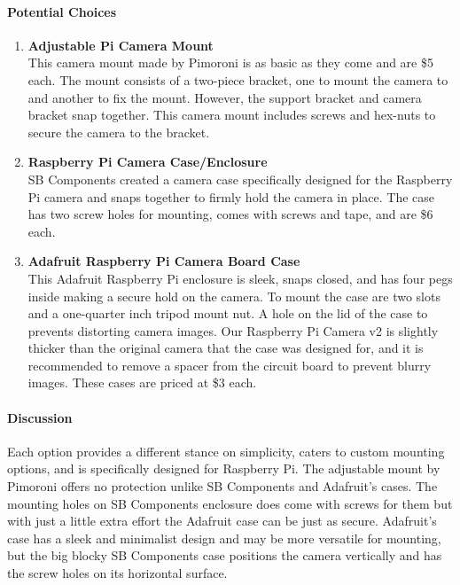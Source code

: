 \paragraph{Potential Choices}
	\begin{enumerate}
		\item\textbf{Adjustable Pi Camera Mount}\\
			This camera mount made by Pimoroni is as basic as they come and are \$5 each. The mount 
			consists of a two-piece bracket, one to mount the camera to and another to fix the 
			mount. However, the support bracket and camera bracket snap together. This camera 
			mount includes screws and hex-nuts to secure the camera to the bracket\cite{AdjCamMt}. \\

		\item\textbf{Raspberry Pi Camera Case/Enclosure}\\
			SB Components created a camera case specifically designed for the Raspberry Pi camera 
			and snaps together to firmly hold the camera in place. The case has two screw holes for 
			mounting, comes with screws and tape, and are \$6 each\cite{BlueCase}. \\

		\item\textbf{Adafruit Raspberry Pi Camera Board Case}\\
			This Adafruit Raspberry Pi enclosure is sleek, snaps closed, and has four pegs inside making a 
			secure hold on the camera. To mount the case are two slots and a 
			one-quarter inch tripod mount nut. A hole on the lid of the case to prevents 
			distorting camera images. Our Raspberry Pi Camera v2 is slightly thicker than the 
			original camera that the case was designed for, and it is recommended to remove a spacer from 
			the circuit board to prevent blurry images. These cases are priced at \$3 each\cite{adafruitCase}.\\
	\end{enumerate}

\paragraph{Discussion}

Each option provides a different stance on simplicity, caters to custom mounting 
options, and is specifically designed for Raspberry Pi. The adjustable mount 
by Pimoroni offers no protection unlike SB Components and Adafruit's cases. The 
mounting holes on SB Components enclosure does come with screws for them but with 
just a little extra effort the Adafruit case can be just as secure. Adafruit's 
case has a sleek and minimalist design and may be more versatile for mounting, but 
the big blocky SB Components case positions the camera vertically and has the 
screw holes on its horizontal surface. \\

